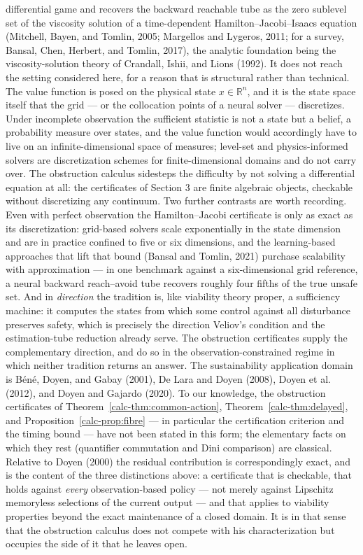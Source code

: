\documentclass[10pt,twocolumn]{article}
\theoremstyle{definition}
\begin{document}
differential game and recovers the backward reachable tube as the zero sublevel set of the
viscosity solution of a time-dependent Hamilton--Jacobi--Isaacs equation (Mitchell, Bayen,
and Tomlin, 2005; Margellos and Lygeros, 2011; for a survey, Bansal, Chen, Herbert, and
Tomlin, 2017), the analytic foundation being the viscosity-solution theory of Crandall, Ishii,
and Lions (1992).  It does not reach the setting considered here, for a reason that is
structural rather than technical.  The value function is posed on the physical state
\(x \in \mathbb{R}^{n}\), and it is the state space itself that the grid --- or the
collocation points of a neural solver --- discretizes.  Under incomplete observation the
sufficient statistic is not a state but a belief, a probability measure over states, and the
value function would accordingly have to live on an infinite-dimensional space of measures;
level-set and physics-informed solvers are discretization schemes for finite-dimensional
domains and do not carry over.  The obstruction calculus sidesteps the difficulty by not
solving a differential equation at all: the certificates of Section 3 are finite algebraic
objects, checkable without discretizing any continuum.  Two further contrasts are worth
recording.  Even with perfect observation the Hamilton--Jacobi certificate is only as exact
as its discretization: grid-based solvers scale exponentially in the state dimension and are
in practice confined to five or six dimensions, and the learning-based approaches that lift
that bound (Bansal and Tomlin, 2021) purchase scalability with approximation --- in one
benchmark against a six-dimensional grid reference, a neural backward reach--avoid tube
recovers roughly four fifths of the true unsafe set.  And in \emph{direction} the tradition
is, like viability theory proper, a sufficiency machine: it computes the states from which
some control against all disturbance preserves safety, which is precisely the direction
Veliov's condition and the estimation-tube reduction already serve.  The obstruction
certificates supply the complementary direction, and do so in the observation-constrained
regime in which neither tradition returns an answer. The sustainability application domain is B\'en\'e, Doyen, and Gabay (2001), De Lara and Doyen (2008), Doyen et al. (2012), and Doyen and Gajardo (2020). To our knowledge, the obstruction certificates of Theorem~\ref{calc-thm:common-action}, Theorem~\ref{calc-thm:delayed}, and Proposition~\ref{calc-prop:fibre} --- in particular the certification criterion and the timing bound --- have not been stated in this form; the elementary facts on which they rest (quantifier commutation and Dini comparison) are classical. Relative to Doyen (2000) the residual contribution is correspondingly exact, and is the content of the three distinctions above: a certificate that is checkable, that holds against \emph{every} observation-based policy --- not merely against Lipschitz memoryless selections of the current output --- and that applies to viability properties beyond the exact maintenance of a closed domain. It is in that sense that the obstruction calculus does not compete with his characterization but occupies the side of it that he leaves open.
\end{document}
